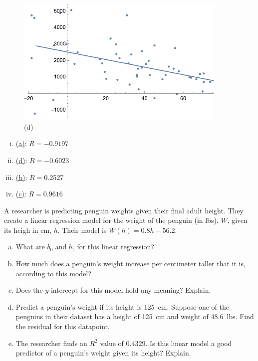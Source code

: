 \documentclass[11pt,letterpaper]{article}
\begin{document}
\begin{figure}[!ht]
\begin{minipage}{0.45\textwidth}
	   \caption*{(c)}
	\end{minipage}
	\begin{minipage}{0.45\textwidth}
	   \centering
	   \includegraphics[width=0.9\textwidth]{reg4.png}
	   \caption*{(d)}
	\end{minipage}
	\end{figure}

\begin{enumerate}[(i)]
\item\underline{\hspace{0.5cm}(a)\hspace{0.5cm}}: $R= -0.9197$
\item\underline{\hspace{0.5cm}(d)\hspace{0.5cm}}: $R= -0.6023$
\item\underline{\hspace{0.5cm}(b)\hspace{0.5cm}}: $R= 0.2527$
\item\underline{\hspace{0.5cm}(c)\hspace{0.5cm}}: $R= 0.9616$
\end{enumerate} 



\newpage



 A researcher is predicting penguin weights given their final adult height. They create a linear regression model for the weight of the penguin (in lbs), $W$, given its heigh in cm, $h$. Their model is $W(h)= 0.8h - 56.2$.
	\begin{enumerate}[(a)]
	\item What are $b_0$ and $b_1$ for this linear regression?
	\item How much does a penguin's weight increase per centimeter taller that it is, according to this model?
	\item Does the $y$-intercept for this model hold any meaning? Explain. 
	\item Predict a penguin's weight if its height is 125~cm. Suppose one of the penguins in their dataset has a height of 125~cm and weight of 48.6~lbs. Find the residual for this datapoint. 
	\item The researcher finds an $R^2$ value of $0.4329$. Is this linear model a good predictor of a penguin's weight given its height? Explain. 
	\end{enumerate} \pspace
\end{document}
